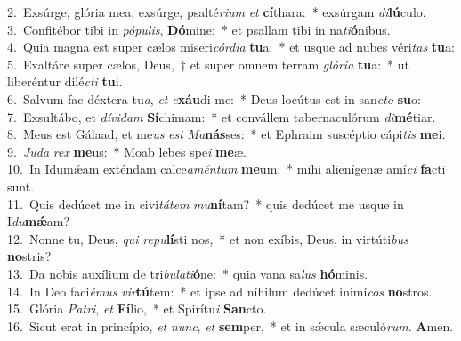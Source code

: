 {2.~}Exsúrge, glória mea, exsúrge, psalté\textit{ri}\textit{um} \textit{et} \textbf{cí}thara:~* exsúrgam \textit{di}\textbf{lú}culo.\\
{3.~}Confitébor tibi in \textit{pó}\textit{pu}\textit{lis}, \textbf{Dó}mine:~* et psallam tibi in na\textit{ti}\textbf{ó}nibus.\\
{4.~}Quia magna est super cælos miseri\textit{cór}\textit{di}\textit{a} \textbf{tu}a:~* et usque ad nubes véri\textit{tas} \textbf{tu}a:\\
{5.~}Exaltáre super cælos, Deus,~† et super omnem terram \textit{gló}\textit{ri}\textit{a} \textbf{tu}a:~* ut liberéntur dilé\textit{cti} \textbf{tu}i.\\
{6.~}Salvum fac déxtera tu\textit{a}, \textit{et} \textit{e}\textbf{xáu}di me:~* Deus locútus est in san\textit{cto} \textbf{su}o:\\
{7.~}Exsultábo, et \textit{dí}\textit{vi}\textit{dam} \textbf{Sí}chimam:~* et convállem tabernaculórum \textit{di}\textbf{mé}tiar.\\
{8.~}Meus est Gálaad, et me\textit{us} \textit{est} \textit{Ma}\textbf{nás}ses:~* et Ephraim suscéptio cápi\textit{tis} \textbf{me}i.\\
{9.~}\textit{Ju}\textit{da} \textit{rex} \textbf{me}us:~* Moab lebes spe\textit{i} \textbf{me}æ.\\
{10.~}In Idumǽam exténdam calce\textit{a}\textit{mén}\textit{tum} \textbf{me}um:~* mihi alienígenæ amí\textit{ci} \textbf{fa}cti sunt.\\
{11.~}Quis dedúcet me in civi\textit{tá}\textit{tem} \textit{mu}\textbf{ní}tam?~* quis dedúcet me usque in I\textit{du}\textbf{mǽ}am?\\
{12.~}Nonne tu, Deus, \textit{qui} \textit{re}\textit{pu}\textbf{lí}sti nos,~* et non exíbis, Deus, in virtúti\textit{bus} \textbf{no}stris?\\
{13.~}Da nobis auxílium de tri\textit{bu}\textit{la}\textit{ti}\textbf{ó}ne:~* quia vana sa\textit{lus} \textbf{hó}minis.\\
{14.~}In Deo faci\textit{é}\textit{mus} \textit{vir}\textbf{tú}tem:~* et ipse ad níhilum dedúcet inimí\textit{cos} \textbf{no}stros.\\
{15.~}Glória \textit{Pa}\textit{tri}, \textit{et} \textbf{Fí}lio,~* et Spirítu\textit{i} \textbf{San}cto.\\
{16.~}Sicut erat in princípio, \textit{et} \textit{nunc}, \textit{et} \textbf{sem}per,~* et in sǽcula sæculó\textit{rum}. \textbf{A}men.\\
